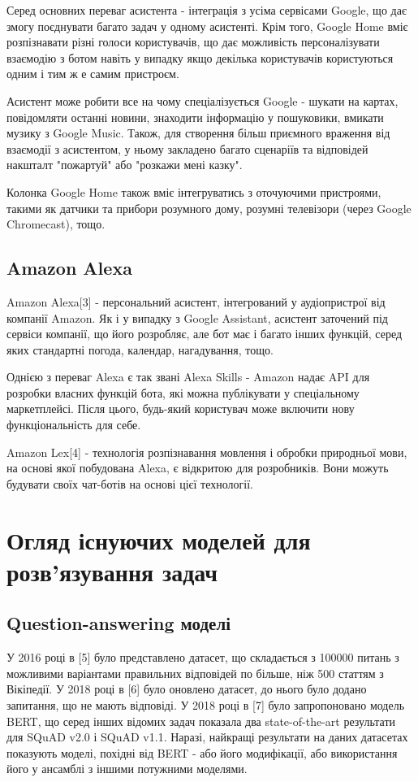 Серед основних переваг асистента - інтеграція з усіма сервісами Google, що дає змогу поєднувати багато задач у одному асистенті. Крім того, Google Home вміє розпізнавати різні голоси користувачів, що дає можливість персоналізувати взаємодію з ботом навіть у випадку якщо декілька користувачів користуються одним і тим ж е самим пристроєм.

Асистент може робити все на чому спеціалізується Google - шукати на картах, повідомляти останні новини, знаходити інформацію у пошуковики, вмикати музику з Google Music. Також, для створення більш приємного враження від взаємодії з асистентом, у ньому закладено багато сценаріїв та відповідей накшталт "пожартуй" або "розкажи мені казку".

Колонка Google Home також вміє інтегруватись з оточуючими пристроями, такими як датчики та прибори розумного дому, розумні телевізори (через Google Chromecast), тощо.
\subsection{Amazon Alexa}
Amazon Alexa[3] - персональний асистент, інтегрований у аудіопристрої від компанії Amazon. Як і у випадку з Google Assistant, асистент заточений під сервіси компанії, що його розробляє, але бот має і багато інших функцій, серед яких стандартні погода, календар, нагадування, тощо. 

Однією з переваг Alexa є так звані Alexa Skills - Amazon надає API для розробки власних функцій бота, які можна публікувати у спеціальному маркетплейсі. Після цього, будь-який користувач може включити нову функціональність для себе. 

Amazon Lex[4] - технологія розпізнавання мовлення і обробки природньої мови, на основі якої побудована Alexa, є відкритою для розробників. Вони можуть будувати своїх чат-ботів на основі цієї технології.
\section{Огляд існуючих моделей для розв'язування задач}
\subsection{Question-answering моделі}
У 2016 році в [5] було представлено датасет, що складається з 100000 питань з можливими варіантами правильних відповідей по більше, ніж 500 статтям з Вікіпедії. У 2018 році в [6] було оновлено датасет, до нього було додано запитання, що не мають відповіді. 
У 2018 році в [7] було запропоновано модель BERT, що серед інших відомих задач показала два state-of-the-art результати для SQuAD v2.0 і SQuAD v1.1. Наразі, найкращі результати на даних датасетах показують моделі, похідні від BERT - або його модифікації, або використання його у ансамблі з іншими потужними моделями. 
